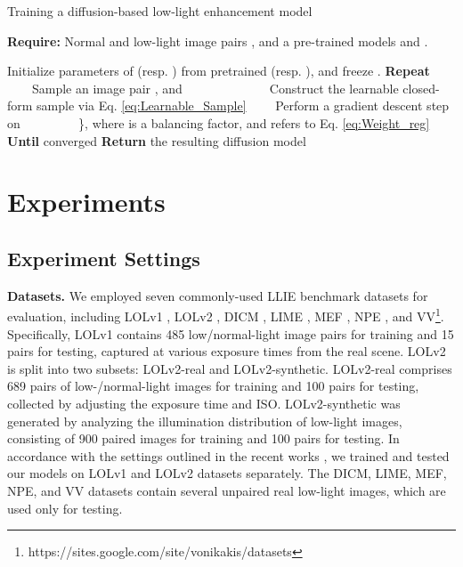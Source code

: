 \documentclass{article}
\begin{document}
\begin{algorithm}

\caption{Training a diffusion-based low-light enhancement model}
\label{alg:overall-training}
\textbf{Require:} Normal and low-light image pairs , and a pre-trained models  and .
\begin{algorithmic}[1]
\State Initialize parameters of  (resp. ) from pretrained  (resp. ), and freeze .
\State \textbf{Repeat}
\State ~~~~Sample an image pair ,  and 
\State ~~~~
\State ~~~~
\State ~~~~Construct the learnable closed-form sample  via Eq. \eqref{eq:Learnable_Sample}
\State ~~~~Perform a gradient descent step on
\State ~~~~~~~~ \}, where  is a balancing factor, and  refers to Eq. \eqref{eq:Weight_reg}
\State \textbf{Until} converged
\State \textbf{Return} the resulting diffusion model 
\end{algorithmic}
\end{algorithm}



\section{Experiments}

\subsection{Experiment Settings}

\textbf{Datasets.}
We employed seven commonly-used LLIE benchmark datasets for evaluation, including LOLv1 \cite{wei2018deep}, LOLv2 \cite{yang2021sparse}, DICM \cite{lee2012contrast}, LIME \cite{guo2016lime}, MEF \cite{li2018structure}, NPE \cite{wang2013naturalness}, and VV\footnote{https://sites.google.com/site/vonikakis/datasets}. Specifically, LOLv1 contains 485 low/normal-light image pairs for training and 15 pairs for testing, captured at various exposure times from the real scene.
LOLv2 is split into two subsets: LOLv2-real and LOLv2-synthetic. LOLv2-real comprises 689 pairs of low-/normal-light images for training and 100 pairs for testing, collected by adjusting the exposure time and ISO. LOLv2-synthetic was generated by analyzing the illumination distribution of low-light images, consisting of 900 paired images for training and 100 pairs for testing. In accordance with the settings outlined in the recent works \cite{xu2022snr,wang2022low,wang2023ultra}, we trained and tested our models on LOLv1 and LOLv2 datasets separately.
The DICM, LIME, MEF, NPE, and VV datasets contain several unpaired real low-light images, which are used only for testing.
\end{document}
